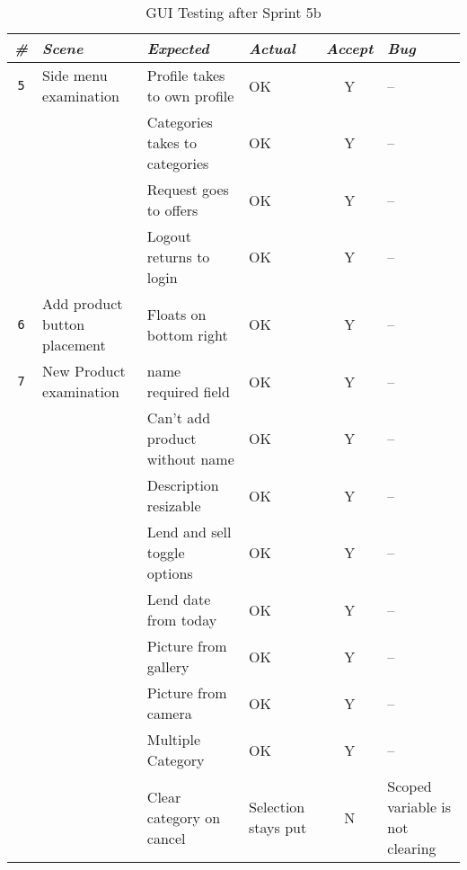 \begin{sidewaystable}
\centering
    \begin{tabularx}{\textwidth}{cbbbcb}
    \toprule
    \centering
    \emph{\textbf{\#}} & \emph{\textbf{Scene}} & \emph{\textbf{Expected}} & \emph{\textbf{Actual}} & \emph{\textbf{Accept}} & \emph{\textbf{Bug}} \\
    \midrule
    \texttt{5}
    		& Side menu examination
    		& Profile takes to own profile
    		& OK
    		& Y
    		& -- \\
    		\cline{3-6} \noalign{\smallskip}
    		&& Categories takes to categories
    		& OK
    		& Y
    		& --\\
    		\cline{3-6} \noalign{\smallskip}
    		&& Request goes to offers
    		& OK
    		& Y
    		& --\\
    		\cline{3-6} \noalign{\smallskip}
    		&& Logout returns to login
    		& OK
    		& Y
    		& --\\
    	\midrule
    	\texttt{6}
    		& Add product button placement
    		& Floats on bottom right
    		& OK
    		& Y
    		& -- \\
    	\midrule
    	\texttt{7}
    		& New Product examination
    		& name required field
    		& OK
    		& Y
    		& -- \\
    		\cline{3-6} \noalign{\smallskip}
    		&& Can't add product without name
    		& OK
    		& Y
    		& --\\
    		\cline{3-6} \noalign{\smallskip}
    		&& Description resizable
    		& OK
    		& Y
    		& --\\
    		\cline{3-6} \noalign{\smallskip}
    		&& Lend and sell toggle options
    		& OK
    		& Y
    		& --\\
    		\cline{3-6} \noalign{\smallskip}
    		&& Lend date from today
    		& OK
    		& Y
    		& --\\
    		\cline{3-6} \noalign{\smallskip}
    		&& Picture from gallery
    		& OK
    		& Y
    		& --\\
    		\cline{3-6} \noalign{\smallskip}
    		&& Picture from camera
    		& OK
    		& Y
    		& --\\
    		\cline{3-6} \noalign{\smallskip}
    		&& Multiple Category
    		& OK
    		& Y
    		& --\\
    		\cline{3-6} \noalign{\smallskip}
    		&& Clear category on cancel
    		& Selection stays put
    		& N
    		& Scoped variable is not clearing\\
    \bottomrule
    \hline
    \end{tabularx}
    \caption{GUI Testing after Sprint 5b}
    \label{table:table:gui-test2}
\end{sidewaystable}

